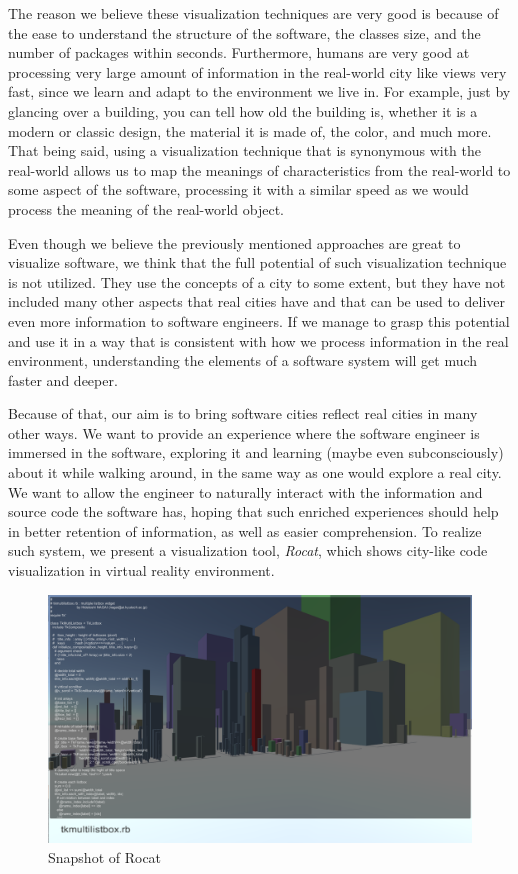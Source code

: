 \documentclass[conference]{IEEEtran}
\begin{document}
The reason we believe these visualization techniques are very good is because of the ease to understand the structure of the software, the classes size, and the number of packages within seconds.
Furthermore, humans are very good at processing very large amount of information in the real-world city like views very fast, since we learn and adapt to the environment we live in.
For example, just by glancing over a building, you can tell how old the building is, whether it is a modern or classic design, the material it is made of, the color, and much more.
That being said, using a visualization technique that is synonymous with the real-world allows us to map the meanings of characteristics from the real-world to some aspect of the software, processing it with a similar speed as we would process the meaning of the real-world object.

Even though we believe the previously mentioned approaches are great to visualize software, we think that the full potential of such visualization technique is not utilized.
They use the concepts of a city to some extent, but they have not included many other aspects that real cities have and that can be used to deliver even more information to software engineers.
If we manage to grasp this potential and use it in a way that is consistent with how we process information in the real environment, understanding the elements of a software system will get much faster and deeper.

Because of that, our aim is to bring software cities reflect real cities in many other ways.
We want to provide an experience where the software engineer is immersed in the software, exploring it and learning (maybe even subconsciously) about it while walking around, in the same way as one would explore a real city.
We want to allow the engineer to naturally interact with the information and source code the software has, hoping that such enriched experiences should help in better retention of information, as well as easier comprehension.
To realize such system, we present a visualization tool, \textit{Rocat}, which shows city-like code visualization in virtual reality environment.

\begin{figure}[t!]
\centering
\includegraphics[bb=0 0 1598 937, width=18cm]{rocat.png}
\caption{Snapshot of Rocat}
\label{figure:Rocat}
\end{figure}
\end{document}
